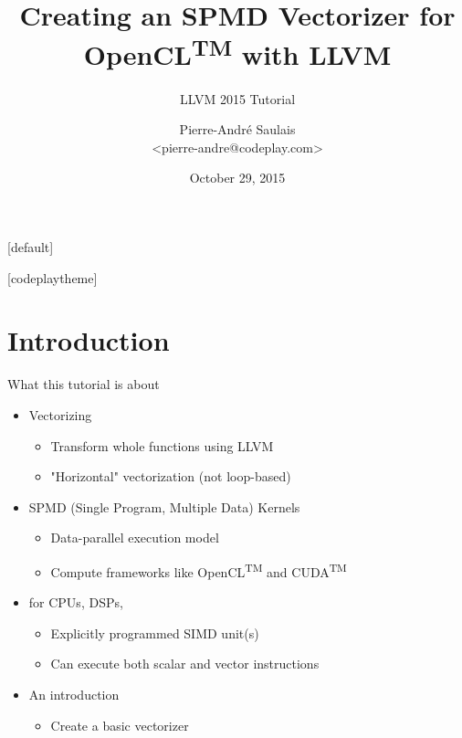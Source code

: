 \documentclass[t,aspectratio=169]{beamer}
\title{Creating an SPMD Vectorizer for OpenCL\textsuperscript{TM} with LLVM}
\subtitle{LLVM 2015 Tutorial}
\author{Pierre-André Saulais \\ <pierre-andre@codeplay.com>}
\institute{Codeplay Software \\ @codeplaysoft}
\date{October 29, 2015}
\begin{document}
[default]

\begin{frame}
  \vspace{4ex}
  \titlepage
\end{frame}


[codeplaytheme]

\section*{Introduction}

\begin{frame}{What this tutorial is about}

\begin{minipage}[t]{0.70\linewidth}

\begin{itemize}  
    \item Vectorizing
    \begin{itemize}
        \item Transform whole functions using LLVM
        \item "Horizontal" vectorization (not loop-based)
    \end{itemize}  
    \item SPMD (Single Program, Multiple Data) Kernels
    \begin{itemize}
        \item Data-parallel execution model
        \item Compute frameworks like OpenCL\textsuperscript{TM} and CUDA\textsuperscript{TM}
    \end{itemize}
    \item for CPUs, DSPs,
    \begin{itemize}
        \item Explicitly programmed SIMD unit(s)
        \item Can execute both scalar and vector instructions
    \end{itemize}
    \item An introduction
    \begin{itemize}
        \item Create a basic vectorizer
    \end{itemize}
\end{itemize}


\end{minipage}
\end{frame}
\end{document}
